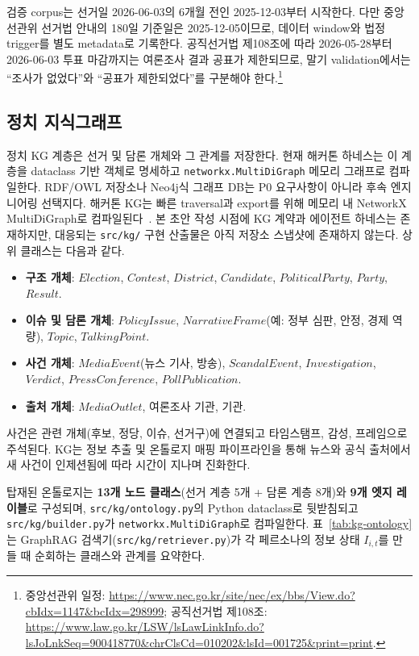\documentclass[11pt]{article}
\begin{document}
검증 corpus는 선거일 2026-06-03의 6개월 전인 2025-12-03부터 시작한다. 다만 중앙선관위 선거법 안내의 180일 기준일은 2025-12-05이므로, 데이터 window와 법정 trigger를 별도 metadata로 기록한다. 공직선거법 제108조에 따라 2026-05-28부터 2026-06-03 투표 마감까지는 여론조사 결과 공표가 제한되므로, 말기 validation에서는 ``조사가 없었다''와 ``공표가 제한되었다''를 구분해야 한다.\footnote{중앙선관위 일정: \url{https://www.nec.go.kr/site/nec/ex/bbs/View.do?cbIdx=1147&bcIdx=298999}; 공직선거법 제108조: \url{https://www.law.go.kr/LSW/lsLawLinkInfo.do?lsJoLnkSeq=900418770&chrClsCd=010202&lsId=001725&print=print}.}

\subsection{정치 지식그래프}

정치 KG 계층은 선거 및 담론 개체와 그 관계를 저장한다. 현재 해커톤 하네스는 이 계층을 dataclass 기반 객체로 명세하고 \texttt{networkx.MultiDiGraph} 메모리 그래프로 컴파일한다. RDF/OWL 저장소나 Neo4j식 그래프 DB는 P0 요구사항이 아니라 후속 엔지니어링 선택지다. 해커톤 KG는 빠른 traversal과 export를 위해 메모리 내 NetworkX MultiDiGraph로 컴파일된다~\cite{hagberg2008networkx}. 본 초안 작성 시점에 KG 계약과 에이전트 하네스는 존재하지만, 대응되는 \texttt{src/kg/} 구현 산출물은 아직 저장소 스냅샷에 존재하지 않는다. 상위 클래스는 다음과 같다.

\begin{itemize}
  \item \textbf{구조 개체}: $Election$, $Contest$, $District$, $Candidate$, $PoliticalParty$, $Party$, $Result$.
  \item \textbf{이슈 및 담론 개체}: $PolicyIssue$, $NarrativeFrame$(예: 정부 심판, 안정, 경제 역량), $Topic$, $TalkingPoint$.
  \item \textbf{사건 개체}: $MediaEvent$(뉴스 기사, 방송), $ScandalEvent$, $Investigation$, $Verdict$, $PressConference$, $PollPublication$.
  \item \textbf{출처 개체}: $MediaOutlet$, 여론조사 기관, 기관.
\end{itemize}

사건은 관련 개체(후보, 정당, 이슈, 선거구)에 연결되고 타임스탬프, 감성, 프레임으로 주석된다. KG는 정보 추출 및 온톨로지 매핑 파이프라인을 통해 뉴스와 공식 출처에서 새 사건이 인제션됨에 따라 시간이 지나며 진화한다.

탑재된 온톨로지는 \textbf{13개 노드 클래스}(선거 계층 5개 + 담론 계층 8개)와 \textbf{9개 엣지 레이블}로 구성되며, \texttt{src/kg/ontology.py}의 Python dataclass로 뒷받침되고 \texttt{src/kg/builder.py}가 \texttt{networkx.MultiDiGraph}로 컴파일한다. 표~\ref{tab:kg-ontology}는 GraphRAG 검색기(\texttt{src/kg/retriever.py})가 각 페르소나의 정보 상태 $I_{i,t}$를 만들 때 순회하는 클래스와 관계를 요약한다.
\end{document}
